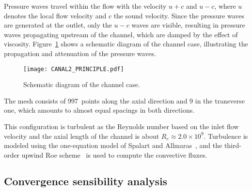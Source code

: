 Pressure waves travel within the flow with the velocity $u + c$ and $u
- c$, where $u$ denotes the local flow velocity and $c$ the sound
velocity. Since the pressure waves are generated at the outlet, only
the $u-c$ waves are visible, resulting in pressure waves propagating
upstream of the channel, which are damped by the effect of
viscosity. Figure~\ref{fig:canal_principle} shows a schematic diagram
of the channel case, illustrating the propagation and attenuation of
the pressure waves.
\begin{figure}[htb]
  \centering
  \texttt{[image: CANAL2\_PRINCIPLE.pdf]}
  \caption{Schematic diagram of the channel case.}
  \label{fig:canal_principle}
\end{figure}

The mesh consists of 997~points along the axial direction and 9 in the
transverse one, which amounts to almost equal spacings in both
directions.


This configuration is turbulent as the Reynolds number based on the
inlet flow velocity and the axial length of the channel is about $R_e
\approx 2.0 \times 10^9$.  Turbulence is modeled using the
one-equation model of Spalart and Allmaras~\cite{Spalart1992}, and the
third-order upwind Roe scheme~\cite{Roe1981} is used to compute the
convective fluxes.

\subsection{Convergence sensibility analysis}


